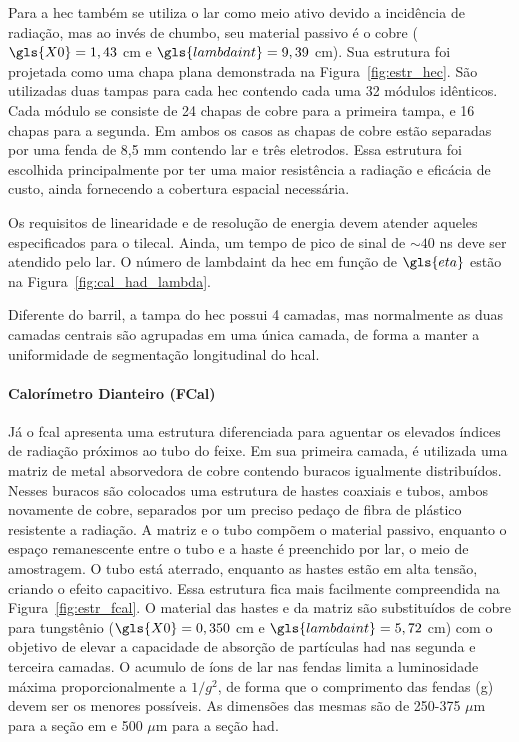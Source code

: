 Para a \gls{hec} também se utiliza o \gls{lar} como meio ativo devido a
incidência de radiação, mas ao invés de chumbo, seu material passivo é o cobre
($\gls{X0} = 1,43$ cm e $\gls{lambdaint}=9,39$ cm). 
Sua estrutura foi projetada como uma chapa plana 
demonstrada na Figura~\ref{fig:estr_hec}. São utilizadas duas tampas para cada
\gls{hec} contendo cada uma 32 módulos idênticos. Cada módulo se consiste de 24
chapas de cobre para a primeira tampa, e 16 chapas para a segunda. Em ambos os
casos as chapas de cobre estão separadas por uma fenda de 8,5 mm contendo
\gls{lar} e três eletrodos. Essa estrutura foi escolhida principalmente por ter
uma maior resistência a radiação e eficácia de custo, ainda fornecendo a
cobertura espacial necessária.

Os requisitos de linearidade e de resolução de energia devem atender aqueles
especificados para o \gls{tilecal}. Ainda, um tempo de pico de sinal
de $\sim40$ ns deve ser atendido pelo \gls{lar}. O número de \gls{lambdaint} da
\gls{hec} em função de $\gls{eta}$ estão na Figura~\ref{fig:cal_had_lambda}.

Diferente do barril, a tampa do \gls{hec}
possui 4 camadas, mas normalmente as duas camadas centrais são agrupadas em uma
única camada, de forma a manter a uniformidade de segmentação longitudinal do
\gls{hcal}.

\paragraph{Calorímetro Dianteiro (FCal)}
\label{par:cal_fcal}

Já o \gls{fcal} apresenta uma estrutura diferenciada
para aguentar os elevados índices de radiação próximos ao tubo do feixe. Em sua primeira camada, 
é utilizada uma matriz de metal absorvedora de cobre contendo buracos igualmente
distribuídos. Nesses buracos são colocados uma estrutura de hastes coaxiais e tubos, 
ambos novamente de cobre, separados por um preciso pedaço de fibra de plástico resistente
a radiação. A matriz e o tubo compõem o material passivo,
enquanto o espaço remanescente entre o tubo e a haste é preenchido por \gls{lar},
o meio de amostragem. O tubo está aterrado, enquanto as hastes estão em alta tensão, 
criando o efeito capacitivo.
Essa estrutura fica mais facilmente compreendida na Figura~\ref{fig:estr_fcal}. 
O material das hastes e da matriz são substituídos de cobre para tungstênio
($\gls{X0} = 0,350$ cm e $\gls{lambdaint} = 5,72$ cm) com 
o objetivo de elevar a capacidade de absorção de partículas \gls{had} nas segunda 
e terceira camadas. O acumulo de íons de \gls{lar} nas fendas limita a
luminosidade máxima proporcionalmente a $1/g^2$, de forma que o comprimento das
fendas (g) devem ser os menores possíveis. 
As dimensões das mesmas são de 250-375 $\mu$m para a seção \gls{em} 
e 500 $\mu$m para a seção \gls{had}.

